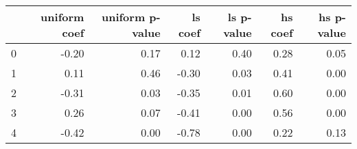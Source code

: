 \begin{tabular}{lrrrrrr}
\toprule
 & uniform coef & uniform p-value & ls coef & ls p-value & hs coef & hs p-value \\
\midrule
0 & -0.20 & 0.17 & 0.12 & 0.40 & 0.28 & 0.05 \\
1 & 0.11 & 0.46 & -0.30 & 0.03 & 0.41 & 0.00 \\
2 & -0.31 & 0.03 & -0.35 & 0.01 & 0.60 & 0.00 \\
3 & 0.26 & 0.07 & -0.41 & 0.00 & 0.56 & 0.00 \\
4 & -0.42 & 0.00 & -0.78 & 0.00 & 0.22 & 0.13 \\
\bottomrule
\end{tabular}
